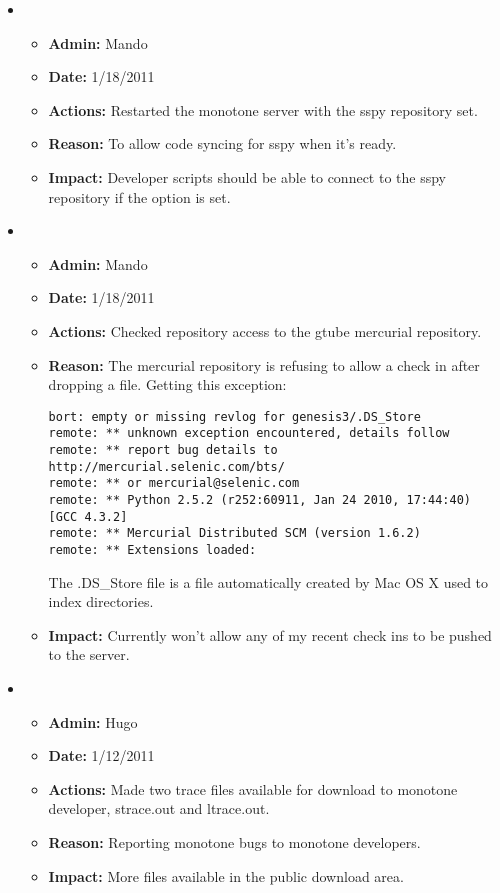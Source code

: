 \documentclass[12pt]{article}
\begin{document}
\begin{itemize}
\item
\begin{itemize}
\item[] {\bf Admin:} Mando
\item[] {\bf Date:} 1/18/2011 
\item[] {\bf Actions:} Restarted the monotone server with the sspy repository set.
\item[] {\bf Reason:} To allow code syncing for sspy when it's ready.
\item[] {\bf Impact:}  Developer scripts should be able to connect to the sspy repository if the option is set.
\end{itemize}

\item
\begin{itemize}
\item[] {\bf Admin:} Mando
\item[] {\bf Date:} 1/18/2011 
\item[] {\bf Actions:} Checked repository access to the gtube mercurial repository.
\item[] {\bf Reason:} The mercurial repository is refusing to allow a check in after dropping a file. Getting this exception:

\begin{verbatim}
bort: empty or missing revlog for genesis3/.DS_Store
remote: ** unknown exception encountered, details follow
remote: ** report bug details to http://mercurial.selenic.com/bts/
remote: ** or mercurial@selenic.com
remote: ** Python 2.5.2 (r252:60911, Jan 24 2010, 17:44:40) [GCC 4.3.2]
remote: ** Mercurial Distributed SCM (version 1.6.2)
remote: ** Extensions loaded: 

\end{verbatim} 

The .DS\_Store file is a file automatically created by Mac OS X used to index directories.  

\item[] {\bf Impact:} Currently won't allow any of my recent check ins to be pushed to the server. 
\end{itemize}

\item
\begin{itemize}
\item[] {\bf Admin:} Hugo
\item[] {\bf Date:} 1/12/2011 
\item[] {\bf Actions:} Made two trace files available for download to monotone developer, strace.out and ltrace.out.
\item[] {\bf Reason:} Reporting monotone bugs to monotone developers.
\item[] {\bf Impact:} More files available in the public download area.
\end{itemize}


\end{itemize}
\end{document}
